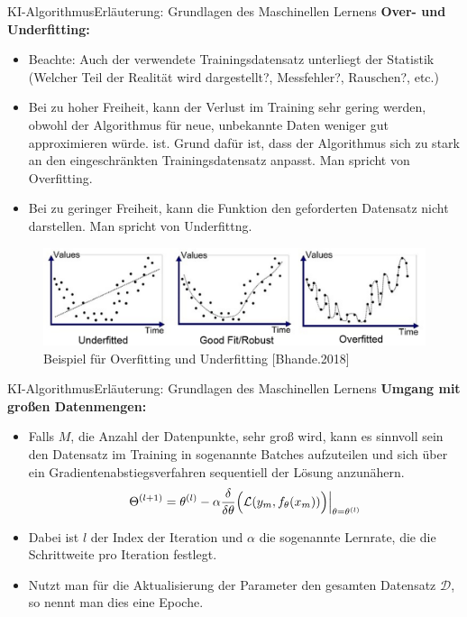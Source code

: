 \documentclass[169, handout	]{THIbeamer} %
\begin{document}
	\begin{frame}{KI-Algorithmus}{Erläuterung: Grundlagen des Maschinellen Lernens}
		\footnotesize		
		\textbf{Over- und Underfitting:}	
		\begin{itemize}
			\item Beachte: Auch der verwendete Trainingsdatensatz unterliegt der Statistik (Welcher Teil der Realität wird dargestellt?, Messfehler?, Rauschen?, etc.)		
			\item Bei zu hoher Freiheit, kann der Verlust im Training sehr gering werden, obwohl der Algorithmus für neue, unbekannte Daten weniger gut approximieren würde. ist. Grund dafür ist, dass der Algorithmus sich zu stark an den eingeschränkten Trainingsdatensatz anpasst. Man spricht von Overfitting.
			\item Bei zu geringer Freiheit, kann die Funktion den geforderten Datensatz nicht darstellen. Man spricht von Underfittng.
		\end{itemize}
		\begin{figure}
			\includegraphics[scale=0.25]{required/Over and Underfitting.png}
			\caption{\scriptsize Beispiel für Overfitting und Underfitting [Bhande.2018]}
        	\label{Over and Underfitting}
		\end{figure}
	\end{frame}
	\begin{frame}{KI-Algorithmus}{Erläuterung: Grundlagen des Maschinellen Lernens}
		\textbf{Umgang mit großen Datenmengen:}
		\begin{itemize}
			\item Falls $M$, die Anzahl der Datenpunkte, sehr groß wird, kann es sinnvoll sein den Datensatz im Training in sogenannte Batches aufzuteilen und sich über ein Gradientenabstiegsverfahren sequentiell der Lösung anzunähern.
			\begin{equation}
				\Theta ^{(l+1)} = \theta ^{(l)} - \alpha \frac{\delta}{\delta \theta} \Bigl(\mathcal{L} (y_m, f_{\theta} (x_m))\Bigr) \Big| _{\theta = \theta^{(l)}}
			\end{equation}
			\item[] Dabei ist $l$ der Index der Iteration und $\alpha$ die sogenannte Lernrate, die die Schrittweite pro Iteration festlegt.
			\item Nutzt man für die Aktualisierung der Parameter den gesamten Datensatz $\mathcal{D}$, so nennt man dies eine Epoche.
		\end{itemize}
	\end{frame}
\end{document}
